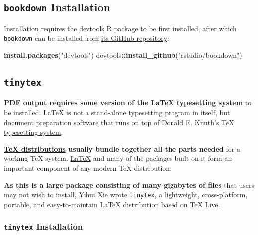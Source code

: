 \documentclass[]{book}
\newenvironment{Shaded}{\begin{snugshade}}{\end{snugshade}}
\newcommand{\KeywordTok}[1]{\textcolor[rgb]{0.13,0.29,0.53}{\textbf{#1}}}
\newcommand{\NormalTok}[1]{#1}
\newcommand{\OperatorTok}[1]{\textcolor[rgb]{0.81,0.36,0.00}{\textbf{#1}}}
\newcommand{\StringTok}[1]{\textcolor[rgb]{0.31,0.60,0.02}{#1}}
\theoremstyle{definition}
\theoremstyle{definition}
\theoremstyle{definition}
\theoremstyle{remark}
\begin{document}
\hypertarget{bookdown-installation}{%
\subsection{\texorpdfstring{\texttt{bookdown}
Installation}{bookdown Installation}}\label{bookdown-installation}}

\href{https://bookdown.org/home/getting-started.html}{Installation}
requires the
\href{https://www.rstudio.com/products/rpackages/devtools/}{devtools} R
package to be first installed, after which \texttt{bookdown} can be
installed from \href{https://github.com/rstudio/bookdown}{its GitHub
repository}:

\begin{Shaded}
\begin{Highlighting}[]
\KeywordTok{install.packages}\NormalTok{(}\StringTok{"devtools"}\NormalTok{)}
\NormalTok{devtools}\OperatorTok{::}\KeywordTok{install_github}\NormalTok{(}\StringTok{"rstudio/bookdown"}\NormalTok{)}
\end{Highlighting}
\end{Shaded}

\hypertarget{tinytex}{%
\subsection{\texorpdfstring{\texttt{tinytex}}{tinytex}}\label{tinytex}}

\textbf{PDF output requires some version of the
\href{https://www.latex-project.org/}{LaTeX} typesetting system} to be
installed. LaTeX is not a stand-alone typesetting program in itself, but
document preparation software that runs on top of Donald E. Knuth's
\href{https://en.wikipedia.org/wiki/TeX}{TeX typesetting system}.

\textbf{\href{https://www.latex-project.org/get/\#tex-distributions}{TeX
distributions} usually bundle together all the parts needed} for a
working TeX system. \href{https://www.latex-project.org/}{LaTeX} and
many of the packages built on it form an important component of any
modern TeX distribution.

\textbf{As this is a large package consisting of many gigabytes of
files} that users may not wish to install,
\href{https://yihui.name/tinytex/}{Yihui Xie wrote \texttt{tinytex}}, a
lightweight, cross-platform, portable, and easy-to-maintain LaTeX
distribution based on \href{https://en.wikipedia.org/wiki/TeX_Live}{TeX
Live}.

\hypertarget{tinytex-installation}{%
\subsubsection{\texorpdfstring{\texttt{tinytex}
Installation}{tinytex Installation}}\label{tinytex-installation}}
\end{document}

